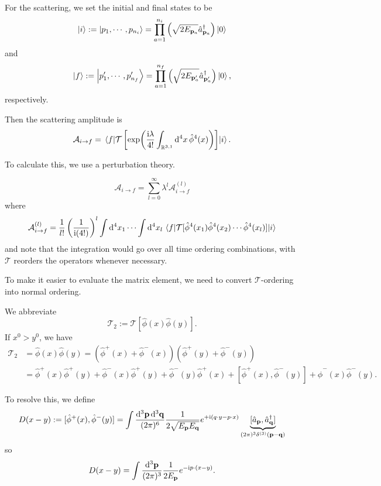 \documentclass[a4paper,11pt]{article}
\begin{document}
	For the scattering, we set the initial and final states to be 
	\[
		\ket{i} := \ket{p_1, \cdots, p _{n_i}} = \prod _{a = 1}^{n_i} \left( \sqrt{2 E _{\vb p _{a}}} \hat a^{\dagger} _{\vb p_a} \right) \ket{0}
	\]
	and
	\[
		\ket{f} := \ket{p'_1, \cdots, p'_{n_f}} = \prod _{a = 1}^{n_f} \left( \sqrt{2 E _{\vb p' _{a}}} \hat a^{\dagger} _{\vb p'_a} \right) \ket{0},
	\]
	respectively.

	Then the scattering amplitude is
	\[
		\mathcal{A}_{i \to f} = \mel{f}{\mathcal{T}\left[\exp(\frac{\mathrm{i} \lambda}{4!} \int _{\mathbb{R}^{3,1}} \dd[4]{x} \hat \phi^4(x))\right]}{i}.
	\]

	To calculate this, we use a perturbation theory. 

	\[
		\mathcal{A}_{i \to f} = \sum _{l = 0}^{\infty} \lambda^l \mathcal{A} _{i \to f}^{(l)}
	\]
	where
	\[
		\mathcal{A}_{i\to f}^{(l)} = \frac{1}{l!} \left( \frac{1}{\mathrm{i} (4!)} \right)^l \int \dd[4]{x_1} \cdots \int \dd[4]{x_l} \mel{f}{\mathcal{T}[\hat \phi^4(x_1) \hat \phi^4(x_2) \cdots \hat \phi^4(x_l)]}{i}
	\]
	and note that the integration would go over all time ordering combinations, with $\mathcal{T}$ reorders the operators whenever necessary. 

	To make it easier to evaluate the matrix element, we need to convert $\mathcal{T}$-ordering into normal ordering.

	We abbreviate
	\[
		\mathcal{T}_2 := \mathcal{T}[\hat \phi(x) \hat \phi(y)].
	\]
	If $x^0 > y^0$, we have
	\begin{align*}
		\mathcal{T}_2 & = \hat \phi(x) \hat \phi(y) = \left( \hat \phi^+(x) + \hat \phi^-(x) \right) \left( \hat \phi^+(y) + \hat \phi^-(y) \right) \\
		& = \hat \phi^+(x)\hat \phi^+(y) + \hat \phi^-(x) \hat \phi^+(y) + \hat \phi^-(y)\hat \phi^+(x) + [\hat \phi^+(x), \hat \phi^-(y)] + \hat \phi^-(x)\hat \phi^-(y).
	\end{align*}
	
	To resolve this, we define
	\[
		D(x-y) := [\hat \phi^+(x), \hat \phi^-(y)] = \int \frac{\dd[3]{\vb p}\dd[3]{\vb q}}{(2 \pi)^6} \frac{1}{2 \sqrt{E _{\vb p}E _{\vb q}}} e^{+\mathrm{i}(q \cdot y - p \cdot x)} \underbrace{[\hat a _{\vb p}, \hat a^{\dagger} _{\vb q}]}_{(2 \pi)^3 \delta ^{(3)}(\vb p - \vb q)}
	\]
	so
	\begin{equation}
		D(x-y) = \int \frac{\dd[3]{\vb p}}{(2\pi)^{3}} \frac{1}{2 E _{\vb p}} e ^{- \mathrm{i}p \cdot(x - y)}.
		\label{eq:3.2.2}
	\end{equation}
\end{document}
